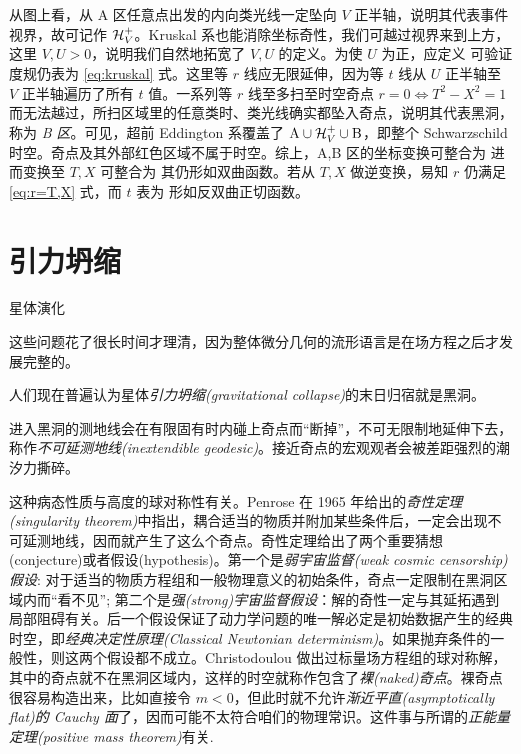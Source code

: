 从图上看，从 A 区任意点出发的内向类光线一定坠向 $V$ 正半轴，说明其代表事件视界，故可记作 $\mathcal{H}_V^+$。Kruskal 系也能消除坐标奇性，我们可越过视界来到上方，这里 $V,U>0$，说明我们自然地拓宽了 $V,U$ 的定义。为使 $U$ 为正，应定义
可验证度规仍表为 \eqref{eq:kruskal} 式。这里等 $r$ 线应无限延伸，因为等 $t$ 线从 $U$ 正半轴至 $V$ 正半轴遍历了所有 $t$ 值。一系列等 $r$ 线至多扫至时空奇点 $r=0\Leftrightarrow T^2-X^2=1$ 而无法越过，所扫区域里的任意类时、类光线确实都坠入奇点，说明其代表黑洞，称为 \textit{B 区}。可见，超前 Eddington 系覆盖了 $\mathrm{A}\cup\mathcal{H}_V^+\cup\mathrm{B}$，即整个 Schwarzschild 时空。奇点及其外部红色区域不属于时空。综上，A,B 区的坐标变换可整合为
进而变换至 $T,X$ 可整合为
其仍形如双曲函数。若从 $T,X$ 做逆变换，易知 $r$ 仍满足 \eqref{eq:r=T,X} 式，而 $t$ 表为
形如反双曲正切函数。


\section{引力坍缩}\label{sec:collapse}

星体演化

这些问题花了很长时间才理清，因为整体微分几何的流形语言是在场方程之后才发展完整的。

人们现在普遍认为星体\textit{引力坍缩(gravitational collapse)}的末日归宿就是黑洞。

进入黑洞的测地线会在有限固有时内碰上奇点而“断掉”，不可无限制地延伸下去，称作\textit{不可延测地线(inextendible geodesic)}。接近奇点的宏观观者会被差距强烈的潮汐力撕碎。

这种病态性质与高度的球对称性有关。Penrose 在 1965 年给出的\textit{奇性定理(singularity theorem)}中指出，耦合适当的物质并附加某些条件后，一定会出现不可延测地线，因而就产生了这么个奇点。奇性定理给出了两个重要猜想(conjecture)或者假设(hypothesis)。第一个是\textit{弱宇宙监督(weak cosmic censorship)假设}: 对于适当的物质方程组和一般物理意义的初始条件，奇点一定限制在黑洞区域内而“看不见”; 第二个是\textit{强(strong)宇宙监督假设}：解的奇性一定与其延拓遇到局部阻碍有关。后一个假设保证了动力学问题的唯一解必定是初始数据产生的经典时空，即\textit{经典决定性原理(Classical Newtonian determinism)}。如果抛弃条件的一般性，则这两个假设都不成立。Christodoulou 做出过标量场方程组的球对称解，其中的奇点就不在黑洞区域内，这样的时空就称作包含了\textit{裸(naked)奇点}。裸奇点很容易构造出来，比如直接令 $m<0$，但此时就不允许\textit{渐近平直(asymptotically flat)的 Cauchy 面}了，因而可能不太符合咱们的物理常识。这件事与所谓的\textit{正能量定理(positive mass theorem)}有关.


